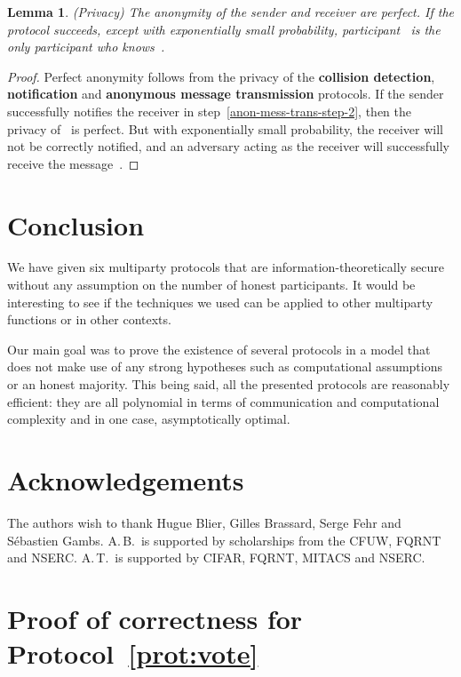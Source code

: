 \documentclass[11pt]{article}
\newtheorem{lemma}[theorem]{Lemma}
\begin{document}
\begin{lemma}(Privacy)
The anonymity of the sender and receiver are perfect. If the
protocol succeeds, except with exponentially small probability,
participant~ is the only participant who knows~.
\end{lemma}
\begin{proof}
Perfect anonymity follows from the privacy of the \textbf{collision
detection}, \textbf{notification} and \textbf{anonymous message
transmission} protocols. If the sender successfully notifies the
receiver in step~\ref{anon-mess-trans-step-2}, then the privacy
of~ is perfect. But with exponentially small probability, the
receiver will not be correctly notified, and an adversary acting as
the receiver will successfully receive the message~.
\end{proof}

\section{Conclusion}

We have given six multiparty protocols that are
information-theoretically secure without any assumption on the
number of honest participants. It would be interesting to see if the
techniques we used can be applied to other multiparty functions or
in other contexts.

Our main goal was to prove the existence of several protocols in a
model that does not make use of any strong hypotheses such as
computational assumptions or an honest majority. This being said,
all the presented protocols are reasonably efficient: they are all
polynomial in terms of communication and computational complexity
and in one case, asymptotically optimal.

\section*{Acknowledgements}
The authors wish to thank Hugue Blier, Gilles Brassard, Serge Fehr
and S\'ebastien Gambs. A.\,B.\ is supported by scholarships from the
\textsc{CFUW}, \textsc{FQRNT} and  \textsc{NSERC}. A.\,T.\ is
supported by \textsc{CIFAR}, \textsc{FQRNT}, \textsc{MITACS} and
\textsc{NSERC}.

\newpage




\appendix{}
\section{Proof of correctness for Protocol~\ref{prot:vote}}
\end{document}
